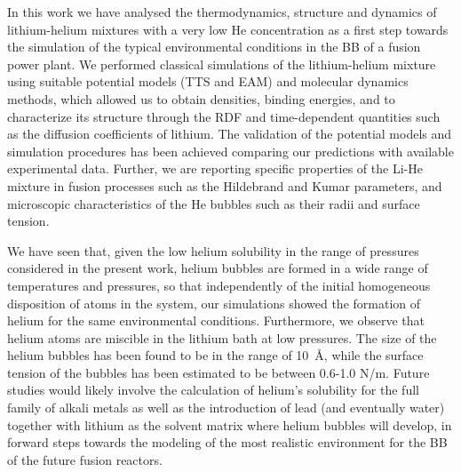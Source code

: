 \documentclass[jcp,amsmath,amssymb,preprint]{revtex4-1}
\begin{document}
In this work we have analysed the thermodynamics, structure and dynamics of lithium-helium mixtures with a very low He concentration as a first step towards the simulation of the typical environmental conditions in the BB of a fusion power plant.  We performed classical simulations of the lithium-helium mixture using suitable potential models (TTS and EAM) and molecular dynamics methods, which allowed us to obtain densities, binding energies, and to characterize its structure through the RDF and time-dependent quantities such as the diffusion coefficients of lithium. The validation of the potential models and simulation procedures has been achieved comparing our predictions with available experimental data. Further, we are reporting specific properties of the Li-He mixture in fusion processes such as the Hildebrand and Kumar parameters, and microscopic characteristics of the He bubbles such as their radii and surface tension.

We have seen that, given the low helium solubility in the range of pressures considered in the present work, helium bubbles are formed in a wide range of temperatures and pressures, so that independently of the initial homogeneous disposition of atoms in the system, our simulations showed the formation of helium for the same environmental conditions. Furthermore, we observe that helium atoms are miscible in the lithium bath at low pressures. The size of the helium bubbles has been found to be in the range of 10~\AA, while the surface tension of the bubbles has been estimated to be between 0.6-1.0 N/m.  Future studies would likely involve the calculation of helium's solubility for the full family of alkali metals as well as the introduction of lead (and eventually water) together with lithium as the solvent matrix where helium bubbles will develop, in forward steps towards the modeling of the most realistic environment for the BB of the future fusion reactors.
\end{document}
